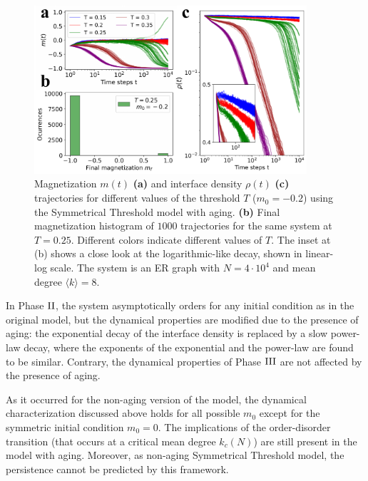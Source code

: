 \begin{figure}
    \centering \captionsetup{font=sf}
    \includegraphics[width=0.9\textwidth]{Figs/Aging_STM/FIG7.pdf}
    \caption[Phase ${\rm I}^{*}$ slow decay and minority consensus]{\label{fig:mixed_phase} Magnetization $m(t)$ \textbf{(a)} and interface density $\rho(t)$ \textbf{(c)} trajectories for different values of the threshold $T$ ($m_0 = -0.2$) using the Symmetrical Threshold model with aging. \textbf{(b)} Final magnetization histogram of $1000$ trajectories for the same system at $T=0.25$. Different colors indicate different values of $T$. The inset at (b) shows a close look at the logarithmic-like decay, shown in linear-log scale. The system is an ER graph with $N = 4 \cdot 10^4$ and mean degree $\langle k \rangle = 8$.}
\end{figure}
In Phase ${\rm II}$, the system asymptotically orders for any initial condition as in the original model, but the dynamical properties are modified due to the presence of aging: the exponential decay of the interface density is replaced by a slow power-law decay, where the exponents of the exponential and the power-law are found to be similar. Contrary, the dynamical properties of Phase ${\rm III}$ are not affected by the presence of aging. 

As it occurred for the non-aging version of the model, the dynamical characterization discussed above holds for all possible
$m_0$ except for the symmetric initial condition $m_0 = 0$. The implications of the order-disorder transition (that occurs at a critical mean degree $k_c (N)$) \cite{Konstantin} are still present in the model with aging. Moreover, as non-aging Symmetrical Threshold model, the persistence cannot be predicted by this framework.

